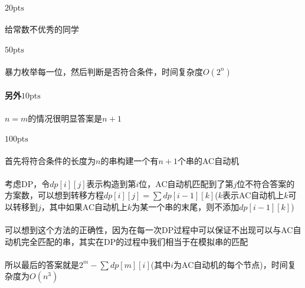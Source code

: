 \documentclass[UTF8]{ctexart}
\begin{document}
\paragraph{$20\mathrm{pts}$}
\paragraph{}给常数不优秀的同学
\paragraph{$50\mathrm{pts}$}
\paragraph{}暴力枚举每一位，然后判断是否符合条件，时间复杂度$O(2^n)$
\paragraph{另外$10\mathrm{pts}$}
\paragraph{}$n=m$的情况很明显答案是$n+1$
\paragraph{$100\mathrm{pts}$}
\paragraph{}首先将符合条件的长度为$n$的串构建一个有$n+1$个串的AC自动机
\paragraph{}考虑DP，令$dp[i][j]$表示构造到第$i$位，AC自动机匹配到了第$j$位不符合答案的方案数，可以想到转移方程$dp[i][j]=\sum{dp[i-1][k]}$($k$表示AC自动机上$k$可以转移到$j$，其中如果AC自动机上$k$为某一个串的末尾，则不添加$dp[i-1][k]$)
\paragraph{}可以想到这个方法的正确性，因为在每一次DP过程中可以保证不出现可以与AC自动机完全匹配的串，其实在DP的过程中我们相当于在模拟串的匹配
\paragraph{}所以最后的答案就是$2^m-\sum dp[m][i]$(其中$i$为AC自动机的每个节点)，时间复杂度为$O(n^3)$
\end{document}
